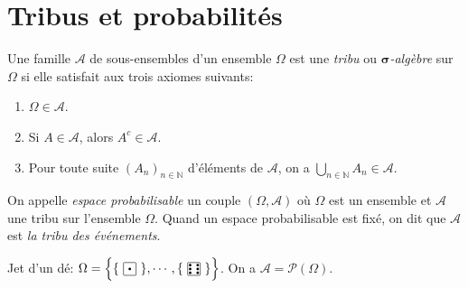\sld{\vfill\pagebreak[5]}%

\section{Tribus et probabilités}
\begin{definition}
Une famille $\mathcal{A}$ de sous-ensembles d'un ensemble $\Omega$ est une \emph{tribu} ou \emph{$\boldsymbol\sigma$-algèbre} sur $\Omega$ si elle satisfait aux trois axiomes suivants:
\begin{enumerate}[label=$(\roman*)$]
	\item $\Omega \in \mathcal{A}$.
	\item Si $A \in \mathcal{A}$, alors $A^c \in \mathcal{A}$.
	\item Pour toute suite $(A_n)_{n \in \mathbb{N}}$ d'éléments de $\mathcal{A}$, on a $\bigcup_{n \in \mathbb{N}} A_n \in \mathcal{A}$.
\end{enumerate}
\end{definition}

\begin{exemple}
 \pl{\rep{4cm}}

\end{exemple}


\sld{\vfill\pagebreak[5]}%

\begin{definition}
On appelle \emph{espace probabilisable} un couple $(\Omega,\mathcal{A})$ où $\Omega$ est un ensemble et $\mathcal{A}$ une tribu sur l'ensemble $\Omega$. Quand un espace probabilisable est fixé, on dit que $\mathcal{A}$ est \emph{la tribu des événements}.
\end{definition}

\begin{exemple}
	Jet d'un dé: $	 \Omega =\Big \{  \{\text{\drawdie{1}} \}, \cdots , \{\text{\drawdie{6}}\}\Big \} $. On a $\mathcal A = \mathcal P(\Omega)$.
\end{exemple} 

